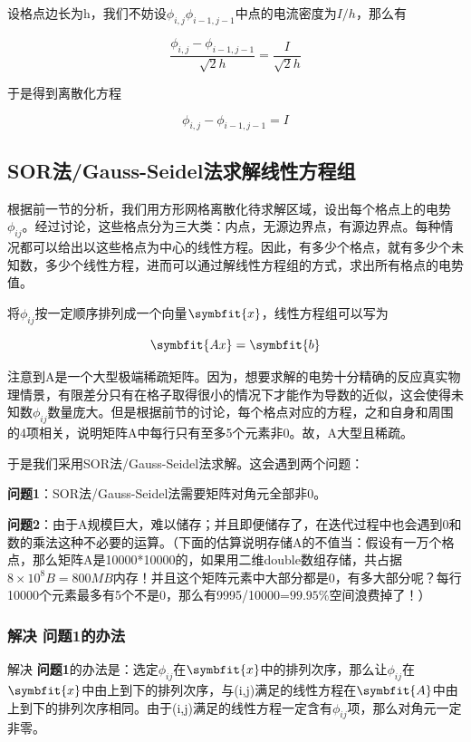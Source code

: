 \documentclass[10pt, a4paper]{article}
\newcommand\vbf{\symbfit}
\begin{document}
    设格点边长为h，我们不妨设$\phi_{i,j}\phi_{i-1,j-1}$中点的电流密度为$I/h$，那么有

    \[\frac{\phi_{i,j}-\phi_{i-1,j-1}}{\sqrt{2}h}=\frac{I}{\sqrt{2}h}\]

    于是得到离散化方程

    \[{\phi_{i,j}-\phi_{i-1,j-1}}={I}\]

    \subsection{SOR法/Gauss-Seidel法求解线性方程组}

    根据前一节的分析，我们用方形网格离散化待求解区域，设出每个格点上的电势$\phi_{ij}$。经过讨论，这些格点分为三大类：内点，无源边界点，有源边界点。每种情况都可以给出以这些格点为中心的线性方程。因此，有多少个格点，就有多少个未知数，多少个线性方程，进而可以通过解线性方程组的方式，求出所有格点的电势值。

    将$\phi_{ij}$按一定顺序排列成一个向量$\vbf{x}$，线性方程组可以写为

    \[\vbf{Ax}=\vbf{b}\]

    注意到A是一个大型极端稀疏矩阵。因为，想要求解的电势十分精确的反应真实物理情景，有限差分只有在格子取得很小的情况下才能作为导数的近似，这会使得未知数$\phi_{ij}$数量庞大。但是根据前节的讨论，每个格点对应的方程，之和自身和周围的4项相关，说明矩阵A中每行只有至多5个元素非0。故，A大型且稀疏。

    于是我们采用SOR法/Gauss-Seidel法求解。这会遇到两个问题：
    
    \textbf{问题1}：SOR法/Gauss-Seidel法需要矩阵对角元全部非0。

    \textbf{问题2}：由于A规模巨大，难以储存；并且即便储存了，在迭代过程中也会遇到0和数的乘法这种不必要的运算。（下面的估算说明存储A的不值当：假设有一万个格点，那么矩阵A是10000*10000的，如果用二维double数组存储，共占据$8\times10^8B=800MB$内存！并且这个矩阵元素中大部分都是0，有多大部分呢？每行10000个元素最多有5个不是0，那么有9995/10000=$99.95\%$空间浪费掉了！）

    \subsubsection{解决 \textbf{问题1}的办法}

    解决 \textbf{问题1}的办法是：选定$\phi_{ij}$在$\vbf{x}$中的排列次序，那么让$\phi_{ij}$在$\vbf{x}$中由上到下的排列次序，与(i,j)满足的线性方程在$\vbf{A}$中由上到下的排列次序相同。由于(i,j)满足的线性方程一定含有$\phi_{ij}$项，那么对角元一定非零。
\end{document}
